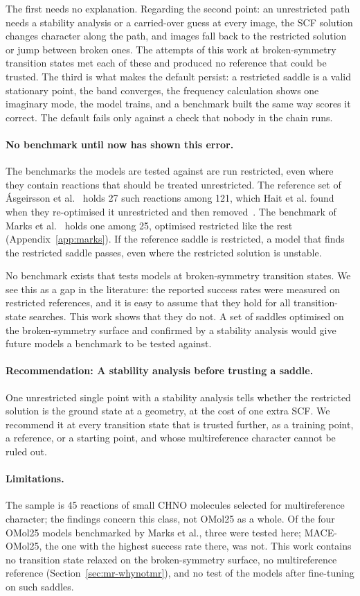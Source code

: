 The first needs no explanation. Regarding the second point: an
unrestricted path needs a stability analysis or a carried-over guess
at every image, the SCF solution changes character along the path, and
images fall back to the restricted solution or jump between broken
ones. The attempts of this work at broken-symmetry transition states
met each of these and produced no reference that could be trusted. The
third is what makes the default persist: a restricted saddle is a
valid stationary point, the band converges, the frequency calculation
shows one imaginary mode, the model trains, and a benchmark built the
same way scores it correct. The default fails only against a check
that nobody in the chain runs.

\paragraph{No benchmark until now has shown this error.} The benchmarks the models
are tested against are run restricted, even where they contain
reactions that should be treated unrestricted. The reference set of
\'Asgeirsson et al.~\cite{asgeirsson2021} holds 27 such reactions
among 121, which Hait et al. found when they re-optimised it
unrestricted and then removed~\cite{hait2025}. The benchmark of Marks
et al.~\cite{marks2026} holds one among 25, optimised restricted like
the rest (Appendix~\ref{app:marks}). If the reference saddle is
restricted, a model that finds the restricted saddle passes, even
where the restricted solution is unstable.

No benchmark exists that tests models at broken-symmetry transition
states. We see this as a gap in the literature: the reported success
rates were measured on restricted references, and it is easy to assume
that they hold for all transition-state searches. This work shows that
they do not. A set of saddles optimised on the broken-symmetry
surface and confirmed by a stability analysis would give future
models a benchmark to be tested against.

\paragraph{Recommendation: A stability analysis before trusting a saddle.} One unrestricted single point with a
stability analysis tells whether the restricted solution is the ground
state at a geometry, at the cost of one extra SCF. We recommend it at
every transition state that is trusted further, as a training point,
a reference, or a starting point, and whose multireference character
cannot be ruled out.

\paragraph{Limitations.} The sample is 45 reactions of small CHNO
molecules selected for multireference character; the findings concern
this class, not OMol25 as a whole. Of the four OMol25 models
benchmarked by Marks et al., three were tested here; MACE-OMol25, the
one with the highest success rate there, was not. This work contains no transition
state relaxed on the broken-symmetry surface, no multireference
reference (Section~\ref{sec:mr-whynotmr}), and no test of the models
after fine-tuning on such saddles.
